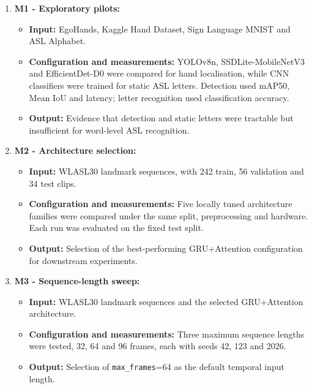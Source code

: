 \begin{enumerate}
    \item \textbf{M1 - Exploratory pilots:}
          \begin{itemize}
              \item \textbf{Input:} EgoHands, Kaggle Hand Dataset, Sign Language MNIST and ASL
                    Alphabet.
              \item \textbf{Configuration and measurements:} YOLOv8n, SSDLite-MobileNetV3 and
                    EfficientDet-D0 were compared for hand localisation, while CNN classifiers
                    were trained for static ASL letters. Detection used mAP50, Mean IoU and
                    latency; letter recognition used classification accuracy.
              \item \textbf{Output:} Evidence that detection and static letters were tractable but
                    insufficient for word-level ASL recognition.
          \end{itemize}

    \item \textbf{M2 - Architecture selection:}
          \begin{itemize}
              \item \textbf{Input:} WLASL30 landmark sequences, with 242 train, 56 validation and
                    34 test clips.
              \item \textbf{Configuration and measurements:} Five locally tuned architecture
                    families were compared under the same split, preprocessing and hardware. Each
                    run was evaluated on the fixed test split.
              \item \textbf{Output:} Selection of the best-performing GRU+Attention configuration
                    for downstream experiments.
          \end{itemize}

    \item \textbf{M3 - Sequence-length sweep:}
          \begin{itemize}
              \item \textbf{Input:} WLASL30 landmark sequences and the selected GRU+Attention
                    architecture.
              \item \textbf{Configuration and measurements:} Three maximum sequence lengths were
                    tested, 32, 64 and 96 frames, each with seeds 42, 123 and 2026.
              \item \textbf{Output:} Selection of \texttt{max\_frames}=64 as the default temporal
                    input length.
          \end{itemize}


\end{enumerate}
